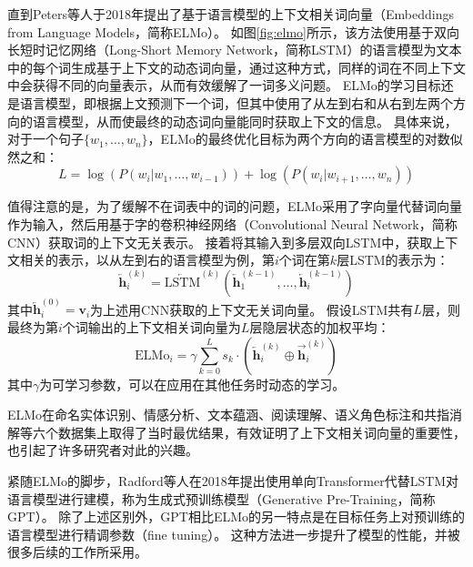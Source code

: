 直到Peters等人于2018年提出了基于语言模型的上下文相关词向量（Embeddings from Language Models，简称ELMo）\cite{peters-etal-2018-deep}。
如图\ref{fig:elmo}所示，该方法使用基于双向长短时记忆网络（Long-Short Memory Network，简称LSTM）的语言模型为文本中的每个词生成基于上下文的动态词向量，通过这种方式，同样的词在不同上下文中会获得不同的向量表示，从而有效缓解了一词多义问题。
ELMo的学习目标还是语言模型，即根据上文预测下一个词，但其中使用了从左到右和从右到左两个方向的语言模型，从而使最终的动态词向量能同时获取上下文的信息。
具体来说，对于一个句子$\{w_1,\dots,w_n\}$，ELMo的最终优化目标为两个方向的语言模型的对数似然之和：
\begin{equation}
    L= \log(P(w_i|w_1,\dots,w_{i-1})) + \log(P(w_i|w_{i+1},\dots,w_{n}))
\end{equation}

值得注意的是，为了缓解不在词表中的词的问题，ELMo采用了字向量代替词向量作为输入，然后用基于字的卷积神经网络（Convolutional Neural Network，简称CNN）获取词的上下文无关表示。
接着将其输入到多层双向LSTM中，获取上下文相关的表示，以从左到右的语言模型为例，第$i$个词在第$k$层LSTM的表示为：
\begin{equation}
    \overleftarrow{\bm{h}}_i^{(k)} = \overleftarrow{\textrm{LSTM}}^{(k)}(\overleftarrow{\bm{h}}_1^{(k-1)},\dots,\overleftarrow{\bm{h}}_i^{(k-1)})
\end{equation}
其中$\overleftarrow{\bm{h}}_i^{(0)}=\bm{v}_i$为上述用CNN获取的上下文无关词向量。
假设LSTM共有$L$层，则最终为第$i$个词输出的上下文相关词向量为$L$层隐层状态的加权平均：
\begin{equation}
    \textrm{ELMo}_i = \gamma \sum_{k=0}^{L}s_k \cdot (\overleftarrow{\bm{h}}_i^{(k)}\oplus\overrightarrow{\bm{h}}_i^{(k)})
\end{equation}
其中$\gamma$为可学习参数，可以在应用在其他任务时动态的学习。

ELMo在命名实体识别\cite{tjong-kim-sang-de-meulder-2003-introduction}、情感分析\cite{socher-etal-2013-recursive}、文本蕴涵\cite{bowman-etal-2015-large}、阅读理解\cite{rajpurkar-etal-2016-squad}、语义角色标注\cite{pradhan-etal-2013-towards}和共指消解\cite{pradhan-etal-2012-conll}等六个数据集上取得了当时最优结果，有效证明了上下文相关词向量的重要性，也引起了许多研究者对此的兴趣。

紧随ELMo的脚步，Radford等人在2018年提出使用单向Transformer代替LSTM对语言模型进行建模，称为生成式预训练模型（Generative Pre-Training，简称GPT）\cite{radford-etal-2018-improving}。
除了上述区别外，GPT相比ELMo的另一特点是在目标任务上对预训练的语言模型进行精调参数（fine tuning）。
这种方法进一步提升了模型的性能，并被很多后续的工作所采用。

